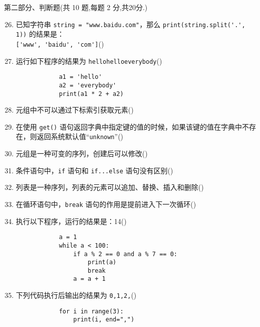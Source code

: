 \documentclass[11pt]{ctexart}
\begin{document}
    \newpage
    {\noindent\heiti 第二部分、判断题(共 10 题,每题 2 分,共20分.)}
    \begin{enumerate}
        \setcounter{enumi}{25}
        \item 已知字符串 \lstinline{string = "www.baidu.com"}，那么 \lstinline{print(string.split('.', 1))} 的结果是：\\\lstinline{['www', 'baidu', 'com']}(\qquad)

        \item 运行如下程序的结果为 \lstinline{hellohelloeverybody}(\qquad)
        \begin{lstlisting}
            a1 = 'hello'
            a2 = 'everybody'
            print(a1 * 2 + a2)
        \end{lstlisting}
        
        \item 元组中不可以通过下标索引获取元素(\qquad)
  
        \item 在使用 \lstinline{get()} 语句返回字典中指定键的值的时候，如果该键的值在字典中不存在，则返回系统默认值“\lstinline{unknown}”(\qquad)
        
        \item 元组是一种可变的序列，创建后可以修改(\qquad)
        
        \item 条件语句中，\lstinline{if} 语句和 \lstinline{if...else} 语句没有区别(\qquad)
        
        \item 列表是一种序列，列表的元素可以追加、替换、插入和删除(\qquad)
        
        \item 在循环语句中，\lstinline{break} 语句的作用是提前进入下一次循环(\qquad)
        
        \item 执行以下程序，运行的结果是：14(\qquad)
        \begin{lstlisting}
            a = 1
            while a < 100:
                if a % 2 == 0 and a % 7 == 0:
                    print(a)
                    break
                a = a + 1
        \end{lstlisting}
        
        \item 下列代码执行后输出的结果为 \lstinline{0,1,2,}(\qquad)
        \begin{lstlisting}
            for i in range(3):
                print(i, end=",")
        \end{lstlisting}
    \end{enumerate}
\end{document}
